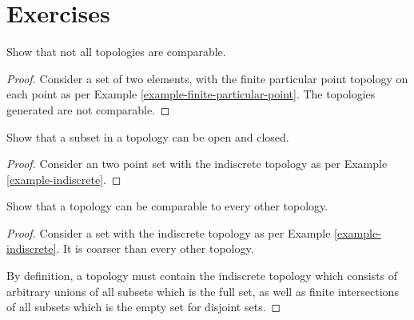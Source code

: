 \section{Exercises}

\begin{exercise}
    \label{exercise-comparable-topology}
Show that not all topologies are comparable.
\end{exercise}

\begin{proof}
    Consider a set of two elements, with the finite particular point topology on each point as per Example \ref{example-finite-particular-point}. The topologies generated are not comparable.
\end{proof}

\begin{exercise}
    \label{exercise-open-closed}
Show that a subset in a topology can be open and closed.
\end{exercise}

\begin{proof}
    Consider an two point set with the indiscrete topology as per Example \ref{example-indiscrete}.
\end{proof}

\begin{exercise}
    \label{exercise-comparable}
Show that a topology can be comparable to every other topology.
\end{exercise}

\begin{proof}
    Consider a set with the indiscrete topology as per Example \ref{example-indiscrete}. It is coarser than every other topology.
    
    By definition, a topology must contain the indiscrete topology which consists of arbitrary unions of all subsets which is the full set, as well as finite intersections of all subsets which is the empty set for disjoint sets.
\end{proof}